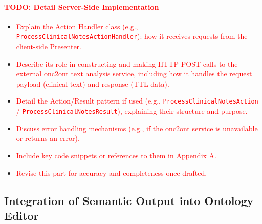         \paragraph{\textcolor{red}{TODO: Detail Server-Side Implementation}}
        \begin{itemize}
            \item[\textcolor{red}{$\bullet$}] \textcolor{red}{Explain the Action Handler class (e.g., \texttt{ProcessClinicalNotesActionHandler}): how it receives requests from the client-side Presenter.}
            \item[\textcolor{red}{$\bullet$}] \textcolor{red}{Describe its role in constructing and making HTTP POST calls to the external onc2ont text analysis service, including how it handles the request payload (clinical text) and response (TTL data).}
            \item[\textcolor{red}{$\bullet$}] \textcolor{red}{Detail the Action/Result pattern if used (e.g., \texttt{ProcessClinicalNotesAction} / \texttt{ProcessClinicalNotesResult}), explaining their structure and purpose.}
            \item[\textcolor{red}{$\bullet$}] \textcolor{red}{Discuss error handling mechanisms (e.g., if the onc2ont service is unavailable or returns an error).}
            \item[\textcolor{red}{$\bullet$}] \textcolor{red}{Include key code snippets or references to them in Appendix A.}
            \item[\textcolor{red}{$\bullet$}] \textcolor{red}{Revise this part for accuracy and completeness once drafted.}
        \end{itemize}

    \subsection{Integration of Semantic Output into Ontology Editor}
